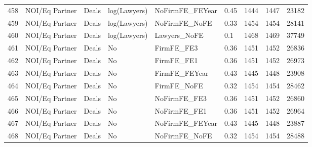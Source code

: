 \documentclass{article}
\begin{document}
\begin{table}[H]
\begin{tabular}{rllllllll}
  458 & NOI/Eq Partner & Deals & log(Lawyers) & NoFirmFE\_FEYear & 0.45 & 1444 & 1447 & 23182 \\ 
  459 & NOI/Eq Partner & Deals & log(Lawyers) & NoFirmFE\_NoFE & 0.33 & 1454 & 1454 & 28141 \\ 
  460 & NOI/Eq Partner & Deals & log(Lawyers) & Lawyers\_NoFE & 0.1 & 1468 & 1469 & 37749 \\ 
  461 & NOI/Eq Partner & Deals & No & FirmFE\_FE3 & 0.36 & 1451 & 1452 & 26836 \\ 
  462 & NOI/Eq Partner & Deals & No & FirmFE\_FE1 & 0.36 & 1451 & 1452 & 26973 \\ 
  463 & NOI/Eq Partner & Deals & No & FirmFE\_FEYear & 0.43 & 1445 & 1448 & 23908 \\ 
  464 & NOI/Eq Partner & Deals & No & FirmFE\_NoFE & 0.32 & 1454 & 1454 & 28462 \\ 
  465 & NOI/Eq Partner & Deals & No & NoFirmFE\_FE3 & 0.36 & 1451 & 1452 & 26860 \\ 
  466 & NOI/Eq Partner & Deals & No & NoFirmFE\_FE1 & 0.36 & 1451 & 1452 & 26964 \\ 
  467 & NOI/Eq Partner & Deals & No & NoFirmFE\_FEYear & 0.43 & 1445 & 1448 & 23887 \\ 
  468 & NOI/Eq Partner & Deals & No & NoFirmFE\_NoFE & 0.32 & 1454 & 1454 & 28488 \\ 
   \hline
\end{tabular}
\end{table}

\newpage
\end{document}
